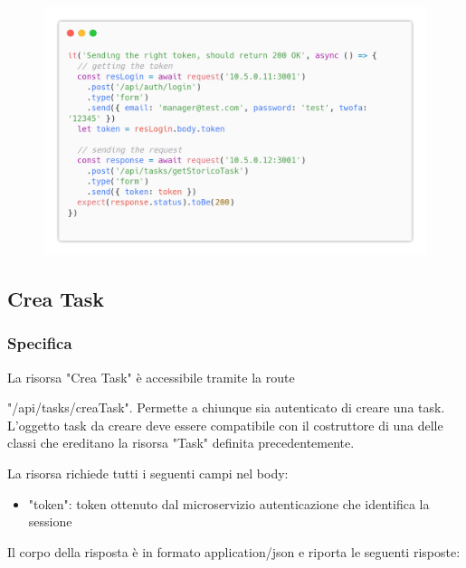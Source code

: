 \documentclass{report}
\begin{document}
\begin{figure}[H]
	\centering\includegraphics[width=1\textwidth]{images/code_storico_test4.png}
\end{figure}


\subsection{Crea Task}
\subsubsection*{Specifica}

La risorsa "Crea Task" è accessibile tramite la route

"/api/tasks/creaTask". Permette a chiunque sia autenticato di creare una task. L'oggetto task da creare deve essere compatibile con il costruttore di una delle classi che ereditano la risorsa "Task" definita precedentemente.

La risorsa richiede tutti i seguenti campi nel body:
\begin{itemize}
	\item "token": token ottenuto dal microservizio autenticazione che identifica la sessione
\end{itemize}

Il corpo della risposta è in formato application/json e riporta le seguenti risposte:
\end{document}
